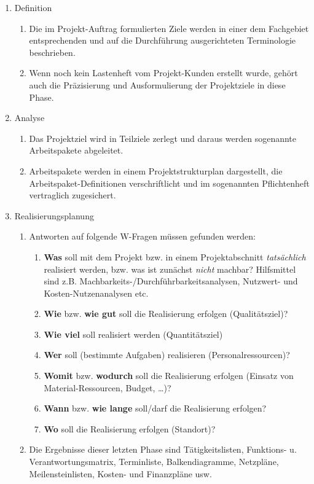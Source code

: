 \begin{enumerate}
	\item Definition
	\begin{enumerate}
		\item Die im Projekt-Auftrag formulierten Ziele werden in einer dem Fachgebiet entsprechenden und auf die Durchführung ausgerichteten Terminologie beschrieben.
		\item Wenn noch kein Lastenheft vom Projekt-Kunden erstellt wurde, gehört auch die Präzisierung und Ausformulierung der Projektziele in diese Phase.
	\end{enumerate}
	\item Analyse
	\begin{enumerate}
		\item Das Projektziel wird in Teilziele zerlegt und daraus werden sogenannte Arbeitspakete abgeleitet.
		\item Arbeitspakete werden in einem Projektstrukturplan dargestellt, die Arbeitspaket-Definitionen verschriftlicht und im sogenannten Pflichtenheft vertraglich zugesichert.
	\end{enumerate}
	\item Realisierungsplanung
	\begin{enumerate}
		\item Antworten auf folgende W-Fragen müssen gefunden werden:
			\begin{enumerate}
				\item {\bf Was} soll mit dem Projekt bzw. in einem Projektabschnitt {\it tatsächlich} realisiert werden, bzw. was ist zunächst {\it nicht} machbar? Hilfsmittel sind z.B. Machbarkeits-/Durchführbarkeitsanalysen, Nutzwert- und Kosten-Nutzenanalysen etc.
				\item {\bf Wie} bzw. {\bf wie gut} soll die Realisierung erfolgen (Qualitätsziel)?
				\item {\bf Wie viel} soll realisiert werden (Quantitätsziel)
				\item {\bf Wer} soll (bestimmte Aufgaben) realisieren (Personalressourcen)?
				\item {\bf Womit} bzw. {\bf wodurch} soll die Realisierung erfolgen (Einsatz von Material-Ressourcen, Budget, \dots)?
				\item {\bf Wann} bzw. {\bf wie lange} soll/darf die Realisierung erfolgen?
				\item {\bf Wo} soll die Realisierung erfolgen (Standort)?
			\end{enumerate}				 
		\item Die Ergebnisse dieser letzten Phase sind Tätigkeitslisten, Funktions- u. Verantwortungsmatrix, Terminliste, Balkendiagramme, Netzpläne, Meilensteinlisten, Kosten- und Finanzpläne usw.
	\end{enumerate}	
\end{enumerate}

